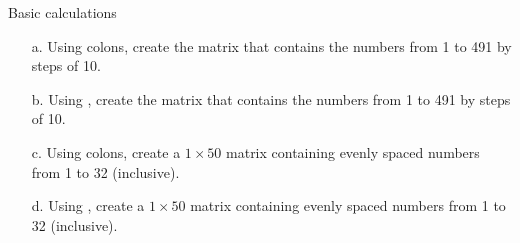 {Basic calculations
\begin{enumerate}
	\item[a.] Using colons, create the matrix that contains the numbers from 1 to 491 by steps of 10. 
	\item[b.] Using , create the matrix that contains the numbers from 1 to 491 by steps of 10. 
	\item[c.] Using colons, create a $1 \times 50$ matrix containing evenly spaced numbers from 1 to 32 (inclusive). 
	\item[d.] Using , create a $1 \times 50$ matrix containing evenly spaced numbers from 1 to 32 (inclusive).
\end{enumerate}}
{}